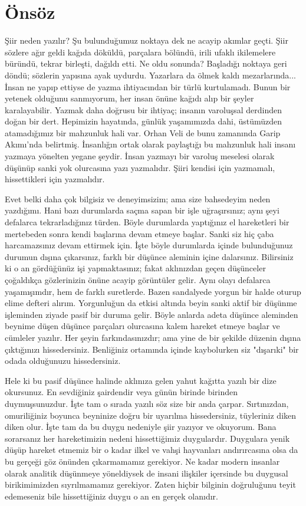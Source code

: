 \section{Önsöz}

Şiir neden yazılır? Şu bulunduğumuz noktaya dek ne acayip akımlar geçti. Şiir sözlere ağır geldi kağıda döküldü, parçalara bölündü, irili ufaklı ikilemelere büründü, tekrar birleşti, dağıldı etti. Ne oldu sonunda? Başladığı noktaya geri döndü; sözlerin yapısına ayak uydurdu. Yazarlara da ölmek kaldı mezarlarında...
İnsan ne yapıp ettiyse de yazma ihtiyacından bir türlü kurtulamadı. Bunun bir yetenek olduğunu sanmıyorum, her insan önüne kağıdı alıp bir şeyler karalayabilir. Yazmak daha doğrusu bir ihtiyaç; insanın varoluşsal derdinden doğan bir dert. Hepimizin hayatında, günlük yaşamımızda dahi, üstümüzden atamadığımız bir mahzunluk hali var. Orhan Veli de bunu zamanında Garip Akımı'nda belirtmiş. İnsanlığın ortak olarak paylaştığı bu mahzunluk hali insanı yazmaya yönelten yegane şeydir. İnsan yazmayı bir varoluş meselesi olarak düşünüp sanki yok olurcasına yazı yazmalıdır. Şiiri kendisi için yazmamalı, hissettikleri için yazmalıdır.

\noindent\newline
Evet belki daha çok bilgisiz ve deneyimsizim; ama size bahsedeyim neden yazdığımı. Hani bazı durumlarda saçma sapan bir işle uğraşırsınız; aynı şeyi defalarca tekrarladığınız türden. Böyle durumlarda yaptığınız el hareketleri bir mertebeden sonra kendi başlarına devam etmeye başlar. Sanki siz hiç çaba harcamazsınız devam ettirmek için. İşte böyle durumlarda içinde bulunduğunuz durumun dışına çıkarsınız, farklı bir düşünce aleminin içine dalarsınız. Bilirsiniz ki o an gördüğünüz işi yapmaktasınız; fakat aklınızdan geçen düşünceler çoğaldıkça gözlerinizin önüne acayip görüntüler gelir. Aynı olayı defalarca yaşamışımdır, hem de farklı suretlerde. Bazen sandalyede yorgun bir halde oturup elime defteri alırım. Yorgunluğun da etkisi altında beyin sanki aktif bir düşünme işleminden ziyade pasif bir duruma gelir. Böyle anlarda adeta düşünce aleminden beynime düşen düşünce parçaları olurcasına kalem hareket etmeye başlar ve cümleler yazılır. Her şeyin farkındasınızdır; ama yine de bir şekilde düzenin dışına çıktığınızı hissedersiniz. Benliğiniz ortamında içinde kaybolurken siz "dışarıki" bir odada olduğunuzu hissedersiniz.

\noindent\newline
Hele ki bu pasif düşünce halinde aklınıza gelen yahut kağıtta yazılı bir dize okursunuz. En sevdiğiniz şairdendir veya günün birinde birinden duymuşsunuzdur. İşte tam o sırada yazılı söz size bir anda çarpar. Sırtınızdan, omuriliğiniz boyunca beyninize doğru bir uyarılma hissedersiniz, tüyleriniz diken diken olur. İşte tam da bu duygu nedeniyle şiir yazıyor ve okuyorum. Bana sorarsanız her hareketimizin nedeni hissettiğimiz duygulardır. Duygulara yenik düşüp hareket etmemiz bir o kadar ilkel ve vahşi hayvanları andırırcasına olsa da bu gerçeği göz önünden çıkarmamamız gerekiyor. Ne kadar modern insanlar olarak analitik düşünmeye yöneldiysek de insani ilişkiler içersinde bu duygusal birikimimizden sıyrılmamamız gerekiyor. Zaten hiçbir bilginin doğruluğunu teyit edemeseniz bile hissettiğiniz duygu o an en gerçek olanıdır.

